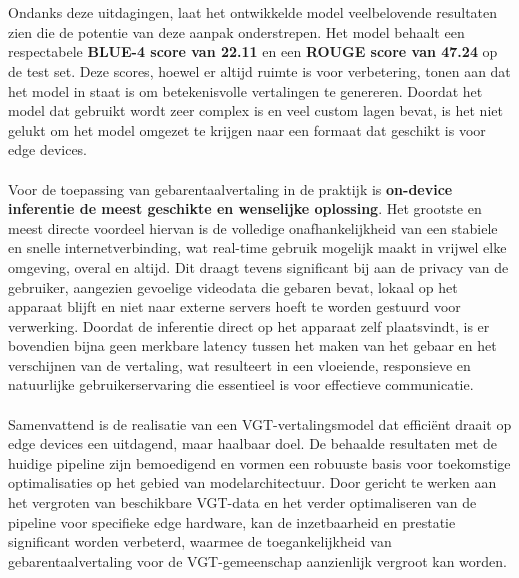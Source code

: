 \\
\\
Ondanks deze uitdagingen, laat het ontwikkelde model veelbelovende resultaten zien die de potentie van deze aanpak onderstrepen. 
Het model behaalt een respectabele \textbf{BLUE-4 score van 22.11} en een \textbf{ROUGE score van 47.24} op de test set. 
Deze scores, hoewel er altijd ruimte is voor verbetering, tonen aan dat het model in staat is om betekenisvolle vertalingen te genereren. 
Doordat het model dat gebruikt wordt zeer complex is en veel custom lagen bevat, is het niet gelukt om het model omgezet te krijgen naar een formaat dat geschikt is voor edge devices.
\\
\\
Voor de toepassing van gebarentaalvertaling in de praktijk is \textbf{on-device inferentie de meest geschikte en wenselijke oplossing}. 
Het grootste en meest directe voordeel hiervan is de volledige onafhankelijkheid van een stabiele en snelle internetverbinding, wat real-time gebruik mogelijk maakt in vrijwel elke omgeving, overal en altijd. 
Dit draagt tevens significant bij aan de privacy van de gebruiker, aangezien gevoelige videodata die gebaren bevat, lokaal op het apparaat blijft en niet naar externe servers hoeft te worden gestuurd voor verwerking. 
Doordat de inferentie direct op het apparaat zelf plaatsvindt, is er bovendien bijna geen merkbare latency tussen het maken van het gebaar en het verschijnen van de vertaling, wat resulteert in een vloeiende, responsieve en natuurlijke gebruikerservaring die essentieel is voor effectieve communicatie.
\\
\\
Samenvattend is de realisatie van een VGT-vertalingsmodel dat efficiënt draait op edge devices een uitdagend, maar haalbaar doel. 
De behaalde resultaten met de huidige pipeline zijn bemoedigend en vormen een robuuste basis voor toekomstige optimalisaties op het gebied van modelarchitectuur. 
Door gericht te werken aan het vergroten van beschikbare VGT-data en het verder optimaliseren van de pipeline voor specifieke edge hardware, kan de inzetbaarheid en prestatie significant worden verbeterd, waarmee de toegankelijkheid van gebarentaalvertaling voor de VGT-gemeenschap aanzienlijk vergroot kan worden.
